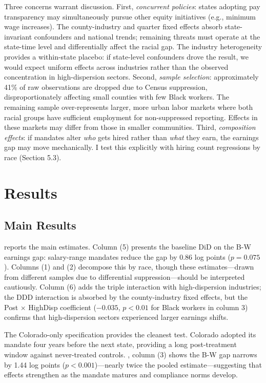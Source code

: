\documentclass[12pt]{article}
\begin{document}
Three concerns warrant discussion. First, \textit{concurrent policies}: states adopting pay transparency may simultaneously pursue other equity initiatives (e.g., minimum wage increases). The county-industry and quarter fixed effects absorb state-invariant confounders and national trends; remaining threats must operate at the state-time level and differentially affect the racial gap. The industry heterogeneity provides a within-state placebo: if state-level confounders drove the result, we would expect uniform effects across industries rather than the observed concentration in high-dispersion sectors. Second, \textit{sample selection}: approximately 41\% of raw observations are dropped due to Census suppression, disproportionately affecting small counties with few Black workers. The remaining sample over-represents larger, more urban labor markets where both racial groups have sufficient employment for non-suppressed reporting. Effects in these markets may differ from those in smaller communities. Third, \textit{composition effects}: if mandates alter \textit{who} gets hired rather than \textit{what} they earn, the earnings gap may move mechanically. I test this explicitly with hiring count regressions by race (Section 5.3).

\section{Results}

\subsection{Main Results}

 reports the main estimates. Column (5) presents the baseline DiD on the B-W earnings gap: salary-range mandates reduce the gap by 0.86 log points ($p = 0.075$). Columns (1) and (2) decompose this by race, though these estimates---drawn from different samples due to differential suppression---should be interpreted cautiously. Column (6) adds the triple interaction with high-dispersion industries; the DDD interaction is absorbed by the county-industry fixed effects, but the Post $\times$ HighDisp coefficient ($-0.035$, $p < 0.01$ for Black workers in column 3) confirms that high-dispersion sectors experienced larger earnings shifts.



The Colorado-only specification provides the cleanest test. Colorado adopted its mandate four years before the next state, providing a long post-treatment window against never-treated controls. , column (3) shows the B-W gap narrows by 1.44 log points ($p < 0.001$)---nearly twice the pooled estimate---suggesting that effects strengthen as the mandate matures and compliance norms develop.
\end{document}
